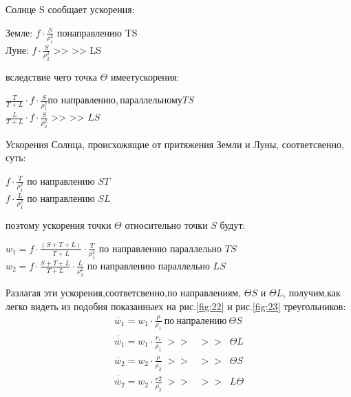 \documentclass[a4paper,12pt]{article}
\begin{document}
Солнце S сообщает ускорения:
\begin{center}
    Земле: \; $f\cdot \frac{S}{\rho_{1}^2}$ \;по\;направлению\; TS \\
    Луне: \; $f\cdot \frac{S}{\rho_{2}^2}$ \; >> \;\;\; >> \;\;\;LS\\
\end{center}
вследствие чего точка $\Theta$ \:имеет\:ускорения:

\begin{center}
    $\frac{T}{T+L} \cdot f \cdot \frac{S}{\rho_{1}^2}$\;по\; направлению,\,параллельному\;$TS$\\
    $\frac{L}{T+L} \cdot f \cdot \frac{S}{\rho_{2}^2}$ \: >> \;\;\; >> \;\; $LS$ \\
\end{center}

Ускорения Солнца, происхожящие от притяжения Земли и Луны, соответсвенно, суть:
\begin{center}
    $f \cdot \frac{T}{\rho_{1}^2}$ по направлению $ST$\\
    $f \cdot \frac{L}{\rho_{1}^2}$ по направлению $SL$\\
\end{center}
поэтому ускорения точки $\Theta$ относительно точки $S$ будут:
\begin{center}
    $w_1 = f\cdot \frac{\left(S+T+L\right)}{T+L} \cdot \frac{T}{\rho_{1}^2}$ по направлению параллельно $TS$ \\
    $w_2 = f\cdot \frac{S+T+L}{T+L} \cdot \frac{L}{\rho_{2}^2}$ по направлению параллельно $LS$ \\
\end{center}
Разлагая эти ускорения,соответсвенно,по направлениям, $\Theta S$ и $\Theta L$, получим,как легко видеть из подобия показанныех на рис.\ref{fig:22} и рис.\ref{fig:23} треугольников:
\begin{equation*}
    \begin{aligned}
        \acute{w_1} = w_1 \cdot \frac{\rho}{\rho_1} \:по\:напралению\: \Theta S \\
        \acute{\acute{w_1}} = w_1 \cdot \frac{r_1}{\rho_1} \;>>\;\;\; >>\;\; \Theta L \\
        \acute{w_2} = w_2 \cdot \frac{\rho}{\rho_2} \;>>\;\;\; >>\;\; \Theta S \\
        \acute{\acute{w_2}} = w_2 \cdot \frac{r2}{\rho_2} \;>>\;\;\; >>\;\; L\Theta  \\
    \end{aligned}
\end{equation*}
\end{document}
